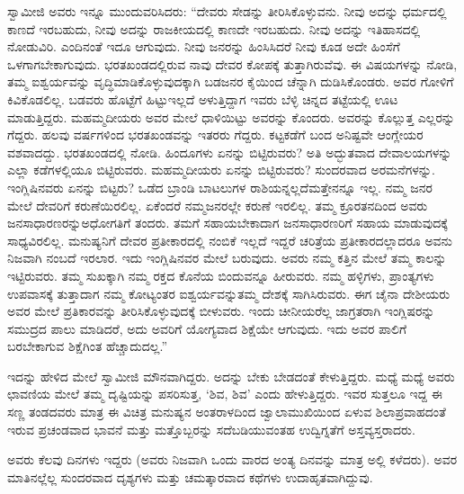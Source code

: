 ಸ್ವಾಮೀಜಿ ಅವರು ಇನ್ನೂ ಮುಂದುವರಿಸಿದರು: “ದೇವರು ಸೇಡನ್ನು ತೀರಿಸಿಕೊಳ್ಳುವನು. ನೀವು ಅದನ್ನು ಧರ್ಮದಲ್ಲಿ ಕಾಣದೆ ಇರಬಹುದು, ನೀವು ಅದನ್ನು ರಾಜಕೀಯದಲ್ಲಿ ಕಾಣದೇ ಇರಬಹುದು. ನೀವು ಅದನ್ನು ಇತಿಹಾಸದಲ್ಲಿ ನೋಡುವಿರಿ. ಎಂದಿನಂತೆ ಇದೂ ಆಗುವುದು. ನೀವು ಜನರನ್ನು ಹಿಂಸಿಸಿದರೆ ನೀವು ಕೂಡ ಅದೇ ಹಿಂಸೆಗೆ ಒಳಗಾಗಬೇಕಾಗುವುದು. ಭರತಖಂಡದಲ್ಲಿರುವ ನಾವು ದೇವರ ಕೋಪಕ್ಕೆ ತುತ್ತಾಗಿರುವೆವು. ಈ ವಿಷಯಗಳನ್ನು ನೋಡಿ, ತಮ್ಮ ಐಶ್ವರ್ಯವನ್ನು ವೃದ್ಧಿಮಾಡಿಕೊಳ್ಳುವುದಕ್ಕಾಗಿ ಬಡಜನರ ಕೈಯಿಂದ ಚೆನ್ನಾಗಿ ದುಡಿಸಿಕೊಂಡರು. ಅವರ ಗೋಳಿಗೆ ಕಿವಿಕೊಡಲಿಲ್ಲ. ಬಡವರು ಹೊಟ್ಟೆಗೆ ಹಿಟ್ಟು\break ಇಲ್ಲದೆ ಅಳುತ್ತಿದ್ದಾಗ ಇವರು ಬೆಳ್ಳಿ ಚಿನ್ನದ ತಟ್ಟೆಯಲ್ಲಿ ಊಟ ಮಾಡುತ್ತಿದ್ದರು. ಮಹಮ್ಮದೀ\-ಯರು ಅವರ ಮೇಲೆ ಧಾಳಿಯಿಟ್ಟು ಅವರನ್ನು ಕೊಂದರು. ಅವರನ್ನು ಕೊಲ್ಲುತ್ತ ಎಲ್ಲರನ್ನು ಗೆದ್ದರು. ಹಲವು ವರ್ಷಗಳಿಂದ ಭರತಖಂಡವನ್ನು ಇತರರು ಗೆದ್ದರು. ಕಟ್ಟಕಡೆಗೆ ಬಂದ ಅನಿಷ್ಟವೇ ಆಂಗ್ಲೇಯರ ವಶವಾದದ್ದು. ಭರತಖಂಡದಲ್ಲಿ ನೋಡಿ. ಹಿಂದೂಗಳು ಏನನ್ನು ಬಿಟ್ಟಿರುವರು? ಅತಿ ಅದ್ಭುತವಾದ ದೇವಾಲಯಗಳನ್ನು ಎಲ್ಲಾ ಕಡೆಗಳಲ್ಲಿಯೂ ಬಿಟ್ಟಿರುವರು. ಮಹಮ್ಮದೀಯರು ಏನನ್ನು ಬಿಟ್ಟಿರುವರು? ಸುಂದರವಾದ ಅರಮನೆಗಳನ್ನು. ಇಂಗ್ಲಿಷಿನವರು ಏನನ್ನು ಬಿಟ್ಟರು? ಒಡೆದ ಬ್ರಾಂಡಿ ಬಾಟಲುಗಳ ರಾಶಿಯನ್ನಲ್ಲದೆ\break ಮತ್ತೇನನ್ನೂ ಇಲ್ಲ. ನಮ್ಮ ಜನರ ಮೇಲೆ ದೇವರಿಗೆ ಕರುಣೆಯಿರಲಿಲ್ಲ. ಏಕೆಂದರೆ ನಮ್ಮ\break ಜನರಲ್ಲೇ ಕರುಣೆ ಇರಲಿಲ್ಲ. ತಮ್ಮ ಕ್ರೂರತನದಿಂದ ಅವರು ಜನಸಾಧಾರಣರನ್ನು\break ಅಧೋಗತಿಗೆ ತಂದರು. ತಮಗೆ ಸಹಾಯಬೇಕಾದಾಗ ಜನಸಾಧಾರಣರಿಗೆ ಸಹಾಯ ಮಾಡುವುದಕ್ಕೆ ಸಾಧ್ಯವಿರಲಿಲ್ಲ. ಮನುಷ್ಯನಿಗೆ ದೇವರ ಪ್ರತೀಕಾರದಲ್ಲಿ ನಂಬಿಕೆ ಇಲ್ಲದೆ ಇದ್ದರೆ ಚರಿತ್ರೆಯ ಪ್ರತೀಕಾರದಲ್ಲಾದರೂ ಅವನು ನಿಜವಾಗಿ ನಂಬದೆ ಇರಲಾರ. ಇದು ಇಂಗ್ಲಿಷಿನವರ ಮೇಲೆ ಬರುವುದು. ಅವರು ನಮ್ಮ ಕತ್ತಿನ ಮೇಲೆ ತಮ್ಮ ಕಾಲನ್ನು ಇಟ್ಟಿರುವರು. ತಮ್ಮ ಸುಖಕ್ಕಾಗಿ ನಮ್ಮ ರಕ್ತದ ಕೊನೆಯ ಬಿಂದುವನ್ನೂ ಹೀರುವರು. ನಮ್ಮ ಹಳ್ಳಿಗಳು, ಪ್ರಾಂತ್ಯಗಳು ಉಪವಾಸಕ್ಕೆ ತುತ್ತಾದಾಗ ನಮ್ಮ ಕೋಟ್ಯಂತರ ಐಶ್ವರ್ಯವನ್ನು\break ತಮ್ಮ ದೇಶಕ್ಕೆ ಸಾಗಿಸಿರುವರು. ಈಗ ಚೈನಾ ದೇಶೀಯರು ಅವರ ಮೇಲೆ ಪ್ರತಿಕಾರವನ್ನು ತೀರಿಸಿಕೊಳ್ಳುವುದಕ್ಕೆ ಬೀಳುವರು. ಇಂದು ಚೀನೀಯರೆಲ್ಲ ಜಾಗ್ರತರಾಗಿ ಇಂಗ್ಲಿಷರನ್ನು ಸಮುದ್ರದ ಪಾಲು ಮಾಡಿದರೆ, ಅದು ಅವರಿಗೆ ಯೋಗ್ಯವಾದ ಶಿಕ್ಷೆಯೇ ಆಗುವುದು. ಇದು ಅವರ ಪಾಲಿಗೆ ಬರಬೇಕಾಗುವ ಶಿಕ್ಷೆಗಿಂತ ಹೆಚ್ಚಾದುದಲ್ಲ.”

\vskip 7pt

ಇದನ್ನು ಹೇಳಿದ ಮೇಲೆ ಸ್ವಾಮೀಜಿ ಮೌನವಾಗಿದ್ದರು. ಅದನ್ನು ಬೇಕು ಬೇಡದಂತೆ ಕೇಳುತ್ತಿದ್ದರು. ಮಧ್ಯೆ ಮಧ್ಯೆ ಅವರು ಛಾವಣಿಯ ಮೇಲೆ ತಮ್ಮ ದೃಷ್ಟಿಯನ್ನು ಪಸರಿಸುತ್ತ, ‘ಶಿವ, ಶಿವ’ ಎಂದು ಹೇಳುತ್ತಿದ್ದರು. ಇವರ ಸುತ್ತಲೂ ಇದ್ದ ಈ ಸಣ್ಣ ತಂಡದವರು ಮಾತ್ರ ಈ ವಿಚಿತ್ರ ಮನುಷ್ಯನ ಅಂತರಾಳದಿಂದ ಜ್ವಾಲಾಮುಖಿಯಿಂದ ಏಳುವ ಶಿಲಾಪ್ರವಾಹದಂತೆ ಇರುವ ಪ್ರಚಂಡವಾದ ಭಾವನೆ ಮತ್ತು ಮತ್ತೊಬ್ಬರನ್ನು ಸದೆಬಡಿಯುವಂತಹ ಉದ್ವಿಗ್ನತೆಗೆ ಅಸ್ತವ್ಯಸ್ತರಾದರು.

\vskip 7pt

ಅವರು ಕೆಲವು ದಿನಗಳು ಇದ್ದರು (ಅವರು ನಿಜವಾಗಿ ಒಂದು ವಾರದ ಅಂತ್ಯ ದಿನವನ್ನು ಮಾತ್ರ ಅಲ್ಲಿ ಕಳೆದರು). ಅವರ ಮಾತಿನಲ್ಲೆಲ್ಲ ಸುಂದರವಾದ ದೃಶ್ಯಗಳು ಮತ್ತು ಚಮತ್ಕಾರವಾದ ಕಥೆಗಳು ಉದಾಹೃತವಾಗಿದ್ದುವು.

\vskip 7pt

